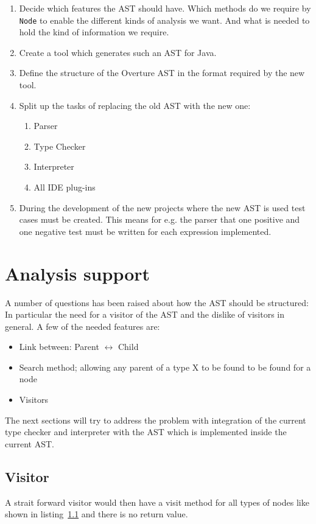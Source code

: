 \documentclass{overturerep}
\begin{document}
\begin{enumerate}

\item Decide which features the AST should have. Which methods do we require by \texttt{Node} to enable the different kinds of analysis we want. And what is needed to hold the kind of information we require.
\item Create a tool which generates such an AST for Java.
\item Define the structure of the Overture AST in the format required by the new tool.
\item Split up the tasks of replacing the old AST with the new one:
\begin{enumerate}
\item Parser
\item Type Checker
\item Interpreter
\item All IDE plug-ins
\end{enumerate}
\item During the development of the new projects where the new AST is used test cases must be created. This means for e.g. the parser that one positive and one negative test must be written for each expression implemented.

\end{enumerate}



\section{Analysis support}
A number of questions has been raised about how the AST should be structured: In particular the need for a visitor of the AST and the dislike of visitors in general.
A few of the needed features are:
\begin{itemize}
\item Link between: Parent $\leftrightarrow$ Child
\item Search method; allowing any parent of a type X to be found to be found for a node
\item Visitors
\end{itemize}

The next sections will try to address the problem with integration of the current type checker and interpreter with the AST which is implemented inside the current AST.


\subsection{Visitor}
A strait forward visitor would then have a visit method for all types of nodes like shown in listing~\ref{} and there is no return value.
\lstset{tabsize=2,frame=single}
\end{document}

